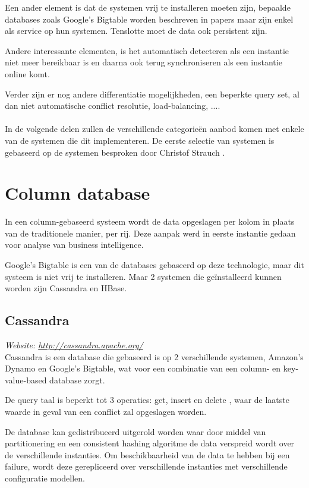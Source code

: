 Een ander element is dat de systemen vrij te installeren moeten zijn, bepaalde databases zoals Google's Bigtable worden beschreven in papers maar zijn enkel als service op hun systemen. Tenslotte moet de data ook persistent zijn. 

Andere interessante elementen, is het automatisch detecteren als een instantie niet meer bereikbaar is en daarna ook terug synchroniseren als een instantie online komt. 

Verder zijn er nog andere differentiatie mogelijkheden, een beperkte query set, al dan niet automatische conflict resolutie, load-balancing, ....  

\paragraph{} In de volgende delen zullen de verschillende categorieën aanbod komen met enkele van de systemen die dit implementeren. De eerste selectie van systemen is gebaseerd op de systemen besproken door Christof Strauch \cite{Strauch.NoSQL}.

\section{Column database}
In een column-gebaseerd systeem wordt de data opgeslagen per kolom in plaats van de traditionele manier, per rij. Deze aanpak werd in eerste instantie gedaan voor analyse van business intelligence. 

Google's Bigtable is een van de databases gebaseerd op deze technologie, maar dit systeem is niet vrij te installeren. Maar 2 systemen die geïnstalleerd kunnen worden zijn Cassandra en HBase. 


\subsection{Cassandra}
\textit{Website: \url{http://cassandra.apache.org/}}\\
Cassandra is een database die gebaseerd is op 2 verschillende systemen, Amazon's Dynamo en Google's Bigtable, wat voor een combinatie van een column- en key-value-based database zorgt. 

De query taal is beperkt tot 3 operaties: get, insert en delete \cite{Lakshman:2010:CDS:1773912.1773922}, waar de  laatste waarde in geval van een conflict zal opgeslagen worden.

De database kan gedistribueerd uitgerold worden waar door middel van partitionering en een consistent hashing algoritme de data verspreid wordt over de verschillende instanties. Om beschikbaarheid van de data te hebben bij een failure, wordt deze gerepliceerd over verschillende instanties met verschillende configuratie modellen. 

